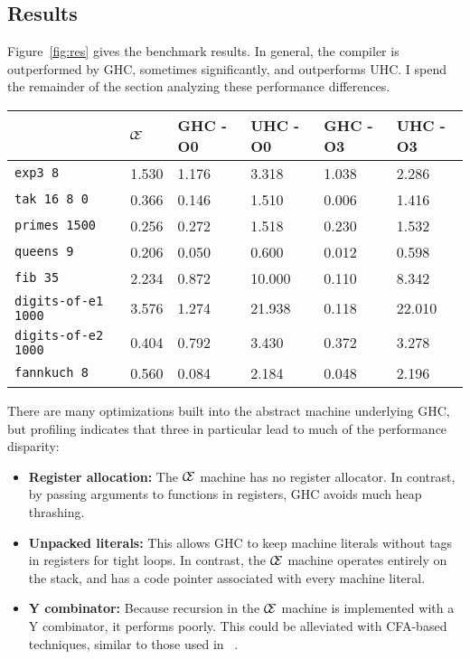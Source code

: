 \subsection{Results} \label{sec:res}

Figure~\ref{fig:res} gives the benchmark results.  In general, the compiler is
outperformed by GHC, sometimes significantly, and outperforms UHC. I spend the
remainder of the section analyzing these performance differences.

\begin{figure*}
\centering
\begin{tabularx}{\textwidth}{l | X | X | X | X | X}
& $\mathcal{\mathcal{C} \mskip -4mu \mathcal{E}}$ & GHC -O0 & UHC -O0 & GHC -O3 & UHC -O3 \\
\hline
\texttt{exp3 8} & 1.530 & 1.176 & 3.318 & 1.038 & 2.286 \\
\texttt{tak 16 8 0} & 0.366 & 0.146 & 1.510 & 0.006 & 1.416 \\
\texttt{primes 1500} & 0.256 & 0.272 & 1.518 & 0.230 & 1.532 \\
\texttt{queens 9} & 0.206 & 0.050 & 0.600 & 0.012 & 0.598 \\
\texttt{fib 35} & 2.234 & 0.872 & 10.000 & 0.110 & 8.342 \\
\texttt{digits-of-e1 1000} & 3.576 & 1.274 & 21.938 & 0.118 & 22.010 \\
\texttt{digits-of-e2 1000} & 0.404 & 0.792 & 3.430 & 0.372 & 3.278 \\
\texttt{fannkuch 8} & 0.560 & 0.084 & 2.184 & 0.048 & 2.196 \\
\end{tabularx}
\caption{Machine Literals Benchmark Results. Measurement is wall clock time,
units are seconds. Times averaged over 5 runs.}
\label{fig:res}
\end{figure*}

There are many optimizations built into the abstract machine underlying GHC,
but profiling indicates that three in particular lead to much of the performance
disparity: 

\begin{itemize}
\item \textbf{Register allocation:} The $\mathcal{\mathcal{C} \mskip -4mu \mathcal{E}}$ machine has no register
allocator. In contrast, by passing arguments to functions in registers, GHC
avoids much heap thrashing.
\item \textbf{Unpacked literals:} This allows GHC to keep machine literals
without tags in registers for tight loops. In contrast, the $\mathcal{\mathcal{C} \mskip -4mu \mathcal{E}}$
machine operates entirely on the stack, and has a code pointer associated with
every machine literal. 
\item \textbf{Y combinator:} Because recursion in the $\mathcal{\mathcal{C} \mskip -4mu \mathcal{E}}$ machine is
implemented with a Y combinator, it performs poorly. This could be alleviated
with CFA-based techniques, similar to those used in ~\cite{rozas1992taming}. 
\end{itemize}


